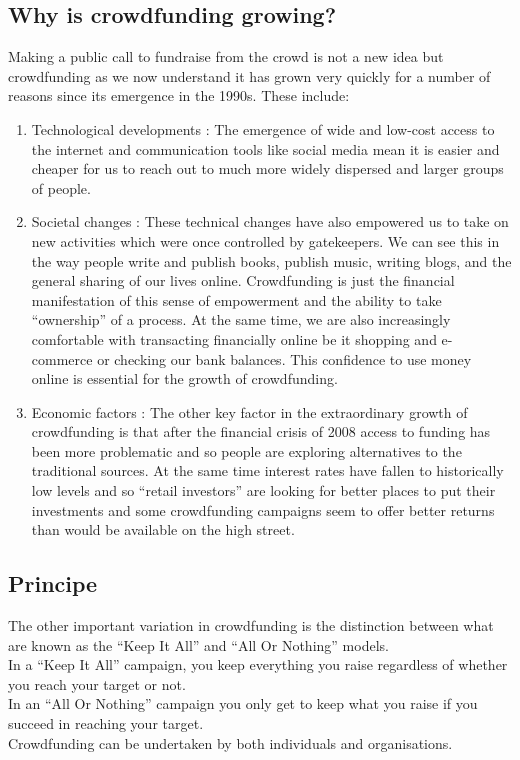 \subsection*{ Why is crowdfunding growing? }
Making a public call to fundraise from the crowd is not a new idea but crowdfunding
as we now understand it has grown very quickly for a number of reasons since its
emergence in the 1990s. These include:
\begin{enumerate}
    \item
          Technological developments : The emergence of wide and low-cost access to the
          internet and communication tools like social media mean it is easier and cheaper for us
          to reach out to much more widely dispersed and larger groups of people.
    \item
          Societal changes : These technical changes have also empowered us to take on
          new activities which were once controlled by gatekeepers. We can see this in the way
          people write and publish books, publish music, writing blogs, and the general sharing
          of our lives online. Crowdfunding is just the financial manifestation of this sense of
          empowerment and the ability to take “ownership” of a process. At the same time, we
          are also increasingly comfortable with transacting financially online be it shopping
          and e-commerce or checking our bank balances. This confidence to use money online
          is essential for the growth of crowdfunding.
    \item
          Economic factors : The other key factor in the extraordinary growth of crowdfunding is
          that after the financial crisis of 2008 access to funding has been more problematic and
          so people are exploring alternatives to the traditional sources. At the same time interest
          rates have fallen to historically low levels and so “retail investors” are looking for better
          places to put their investments and some crowdfunding campaigns seem to offer better
          returns than would be available on the high street.
\end{enumerate}

\subsection*{Principe }
The other important variation in crowdfunding is the distinction between what are
known as the “Keep It All” and “All Or Nothing” models.\\
In a “Keep It All” campaign, you keep everything you raise regardless of whether you
reach your target or not.\\
In an “All Or Nothing” campaign you only get to keep what you raise if you succeed in
reaching your target.\\
Crowdfunding can be undertaken by both individuals and organisations.


